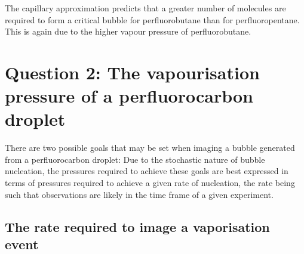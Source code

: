 The capillary approximation predicts that a greater number of molecules are required to form a critical bubble for perfluorobutane than for perfluoropentane.
This is again due to the higher vapour pressure of  perfluorobutane.






\section{Question 2: The vapourisation pressure of a perfluorocarbon droplet}\label{sec:nuc:vapourise}

There are two possible goals that may be set 
when imaging a bubble generated from a perfluorocarbon droplet:
Due to the stochastic nature of bubble nucleation, 
the pressures required to achieve these goals are best expressed in terms of pressures required
to achieve a given rate of nucleation,
the rate being such that observations are likely in the time frame of a given experiment.




\subsection{The rate required to image a vaporisation event}


